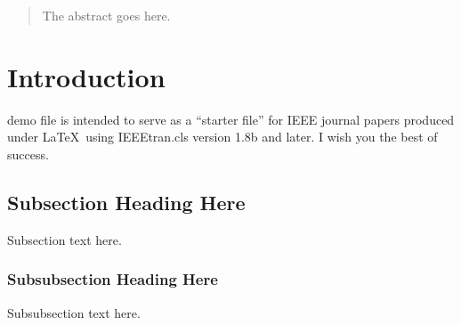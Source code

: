 \documentclass[journal]{IEEEtran}
\begin{document}
\author{Charity Delmus, Hamza Riaz, Jenni Ajderian, Owen O’Neill and Rian Dolphin \\ Mentor: Aparna Nayak}


\maketitle
\begin{abstract}
The abstract goes here.
\end{abstract}


\section{Introduction}
% 
% 
% 
% 
 demo file is intended to serve as a ``starter file''
for IEEE journal papers produced under \LaTeX\ using
IEEEtran.cls version 1.8b and later.
I wish you the best of success.

\subsection{Subsection Heading Here}
Subsection text here.



\subsubsection{Subsubsection Heading Here}
Subsubsection text here.


%
%
\end{document}
